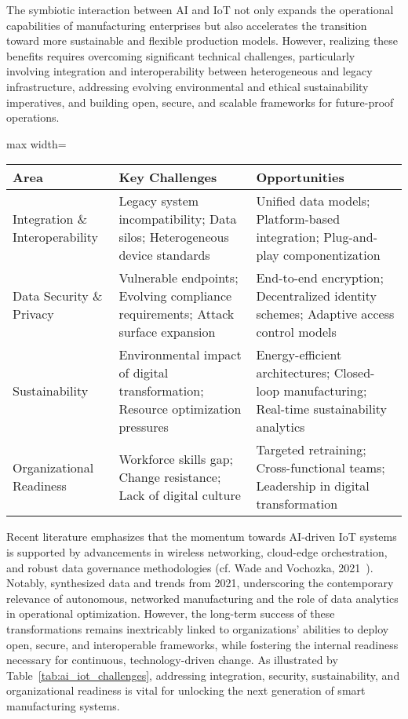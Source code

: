 \documentclass[sigconf]{acmart}
\begin{document}
The symbiotic interaction between AI and IoT not only expands the operational capabilities of manufacturing enterprises but also accelerates the transition toward more sustainable and flexible production models. However, realizing these benefits requires overcoming significant technical challenges, particularly involving integration and interoperability between heterogeneous and legacy infrastructure, addressing evolving environmental and ethical sustainability imperatives, and building open, secure, and scalable frameworks for future-proof operations.

\begin{table*}[htbp]
\centering
\caption{Core Challenges and Opportunities for Data-Driven and AI-Enabled IoT Manufacturing Systems}
\label{tab:ai_iot_challenges}
\begin{adjustbox}{max width=\textwidth}
\begin{tabular}{lll}
\toprule
\textbf{Area} & \textbf{Key Challenges} & \textbf{Opportunities} \\
\midrule
Integration \& Interoperability & Legacy system incompatibility; Data silos; Heterogeneous device standards & Unified data models; Platform-based integration; Plug-and-play componentization \\
Data Security \& Privacy & Vulnerable endpoints; Evolving compliance requirements; Attack surface expansion & End-to-end encryption; Decentralized identity schemes; Adaptive access control models \\
Sustainability & Environmental impact of digital transformation; Resource optimization pressures & Energy-efficient architectures; Closed-loop manufacturing; Real-time sustainability analytics \\
Organizational Readiness & Workforce skills gap; Change resistance; Lack of digital culture & Targeted retraining; Cross-functional teams; Leadership in digital transformation \\
\bottomrule
\end{tabular}
\end{adjustbox}
\end{table*}

Recent literature emphasizes that the momentum towards AI-driven IoT systems is supported by advancements in wireless networking, cloud-edge orchestration, and robust data governance methodologies (cf. Wade and Vochozka, 2021~\cite{ref31}). Notably, \cite{ref31} synthesized data and trends from 2021, underscoring the contemporary relevance of autonomous, networked manufacturing and the role of data analytics in operational optimization. However, the long-term success of these transformations remains inextricably linked to organizations' abilities to deploy open, secure, and interoperable frameworks, while fostering the internal readiness necessary for continuous, technology-driven change. As illustrated by Table~\ref{tab:ai_iot_challenges}, addressing integration, security, sustainability, and organizational readiness is vital for unlocking the next generation of smart manufacturing systems.
\end{document}

